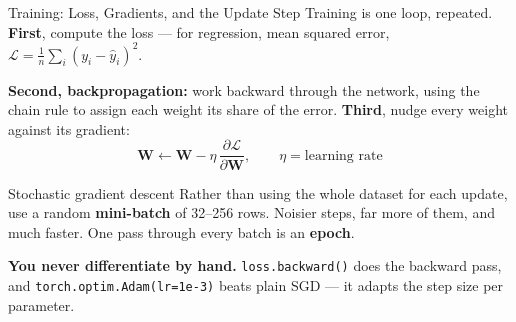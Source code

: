 \documentclass[aspectratio=169, 11pt]{beamer}
\begin{document}
\begin{frame}{Training: Loss, Gradients, and the Update Step}
  Training is one loop, repeated. \textbf{First}, compute the loss --- for regression, mean
  squared error, $\mathcal{L} = \frac{1}{n}\sum_i (y_i - \hat{y}_i)^2$.

  \vspace{0.1cm}
  \textbf{Second, backpropagation:} work backward through the network, using the chain rule to
  assign each weight its share of the error. \textbf{Third}, nudge every weight against its
  gradient:
  \[
    \mathbf{W} \leftarrow \mathbf{W} - \eta \, \frac{\partial \mathcal{L}}{\partial \mathbf{W}},
    \qquad \eta = \text{learning rate}
  \]
  \vspace{-0.3cm}
  \begin{definitionbox}{Stochastic gradient descent}
    Rather than using the whole dataset for each update, use a random \textbf{mini-batch} of
    32--256 rows. Noisier steps, far more of them, and much faster. One pass through every batch
    is an \textbf{epoch}.
  \end{definitionbox}

  \textbf{You never differentiate by hand.} \texttt{loss.backward()} does the backward pass, and
  \texttt{torch.optim.Adam(lr=1e-3)} beats plain SGD --- it adapts the step size per parameter.
\end{frame}
\end{document}
